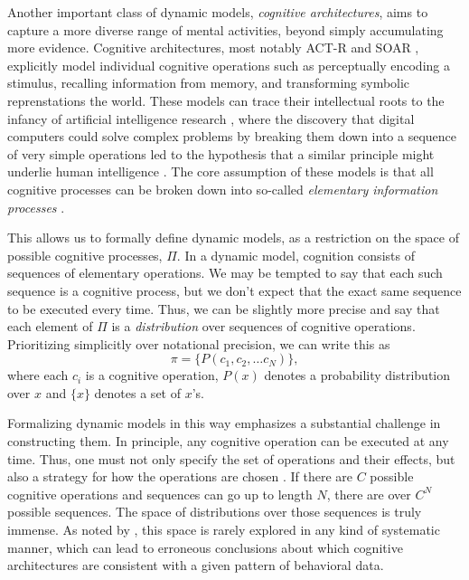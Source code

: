 Another important class of dynamic models, \emph{cognitive architectures}, aims to capture a more diverse range of mental activities, beyond simply accumulating more evidence. Cognitive architectures, most notably ACT-R \citep{anderson1996act} and SOAR \citep{laird1987soar}, explicitly model individual cognitive operations such as perceptually encoding a stimulus, recalling information from memory, and transforming symbolic reprenstations the world. These models can trace their intellectual roots to the infancy of artificial intelligence research \citep{newell1956logic}, where the discovery that digital computers could solve complex problems by breaking them down into a sequence of very simple operations led to the hypothesis that a similar principle might underlie human intelligence \citep{newell1958elements,newell1972human}. The core assumption of these models is that all cognitive processes can be broken down into so-called \emph{elementary information processes} \citep{simon1979information,posner1982information,chase1978elementary}.

This allows us to formally define dynamic models, as a restriction on the space of possible cognitive processes, $\Pi$. In a dynamic model, cognition consists of sequences of elementary operations. We may be tempted to say that each such sequence is a cognitive process, but we don't expect that the exact same sequence to be executed every time. Thus, we can be slightly more precise and say that each element of $\Pi$ is a \emph{distribution} over sequences of cognitive operations. Prioritizing simplicitly over notational precision, we can write this as 
\begin{equation}
   \pi = \{P(c_1, c_2, \ldots c_N)\},
\end{equation}
where each $c_i$ is a cognitive operation, $P(x)$ denotes a probability distribution over $x$ and $\{x\}$ denotes a set of $x$'s. 


Formalizing dynamic models in this way emphasizes a substantial challenge in constructing them. In principle, any cognitive operation can be executed at any time. Thus, one must not only specify the set of operations and their effects, but also a strategy for how the operations are chosen \citep{payne1988adaptive}. If there are $C$ possible cognitive operations and sequences can go up to length $N$, there are over $C^N$ possible sequences. The space of distributions over those sequences is truly immense. As noted by \citet{howes2009rational}, this space is rarely explored in any kind of systematic manner, which can lead to erroneous conclusions about which cognitive architectures are consistent with a given pattern of behavioral data.


